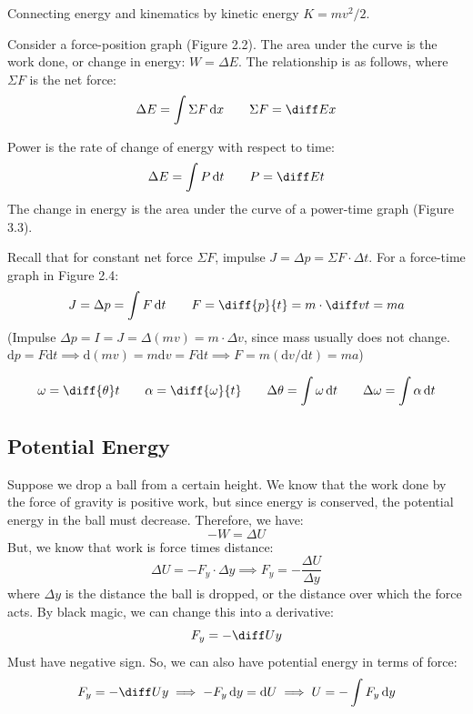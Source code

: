 \documentclass{article}
\newcommand{\theorem}[2]{\begin{tcolorbox}[title={#1},colback=blue!5!white,colframe=blue!75!black,parbox=false] #2 \end{tcolorbox}}
\begin{document}
Connecting energy and kinematics by kinetic energy $K=mv^2/2$.

\theorem{Work and force-position graphs}{
	Consider a force-position graph (Figure 2.2). The area under the curve is the work done, or change in energy: $W=\Delta E$. The relationship is as follows, where $\Sigma F$ is the net force:
	\begin{equation*}
	    \Delta E=\int\Sigma  F\,\mathrm{d}x
		\qquad \Sigma F=\diff Ex
	\end{equation*}
}

\theorem{Power and time}{
	Power is the rate of change of energy with respect to time:
	\begin{equation*}
		\Delta E=\int P\,\mathrm{d}t \qquad P=\diff Et
	\end{equation*}
	The change in energy is the area under the curve of a power-time graph (Figure 3.3).
}

\theorem{Force and time}{
	Recall that for constant net force $\Sigma F$, impulse $J=\Delta p=\Sigma F\cdot \Delta t$. For a force-time graph in Figure 2.4:
	\begin{equation*}
	    J=\Delta p=\int F\,\mathrm{d}t
		\qquad 
		F=\diff{p}{t}=m\cdot \diff vt=ma
	\end{equation*}
	(Impulse $\Delta p=I=J=\Delta(mv)=m \cdot \Delta v$, since mass usually does not change. $\mathrm{d}p=F\mathrm{d} t \implies \mathrm{d}(mv)=m\mathrm{d} v=F\mathrm{d} t\implies F=m(\mathrm{d}v/\mathrm{d}t)=ma$)
}

\theorem{Rotational kinematics}{
	\begin{equation*}
		\omega=\diff{\theta}t \qquad
		\alpha=\diff{\omega}{t} \qquad
		\Delta\theta=\int \omega\,\mathrm{d}t \qquad
		\Delta \omega=\int \alpha\,\mathrm{d}t
	\end{equation*}
}

\subsection{Potential Energy}

Suppose we drop a ball from a certain height. We know that the work done by the force of gravity is positive work, but since energy is conserved, the potential energy in the ball must decrease. Therefore, we have:
\begin{equation*}
    -W=\Delta U 
\end{equation*}
But, we know that work is force times distance:
\begin{equation*}
	\Delta U=-F_y\cdot \Delta y
	\implies F_y=-\frac{\Delta U}{\Delta y}
\end{equation*}
where $\Delta y$ is the distance the ball is dropped, or the distance over which the force acts. By black magic, we can change this into a derivative:
\begin{equation*}
	F_y=-\diff Uy
\end{equation*}
Must have negative sign. So, we can also have potential energy in terms of force:
\begin{equation*}
    F_y=-\diff Uy
	\implies -F_y \,\mathrm{d}y=\mathrm{d}U
	\implies U=-\int F_y\,\mathrm{d}y
\end{equation*}
\end{document}

